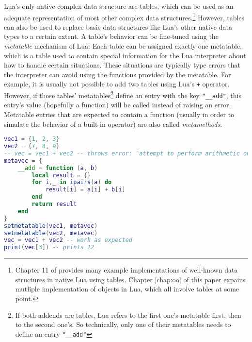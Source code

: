 Lua's only native complex data structure are tables, which can be used as an adequate representation of most other complex data structures.\footnote{Chapter 11 of \cite{Ierusalimschy2006} provides many example implementations of well-known data structures in native Lua using tables. Chapter \ref{chap:oo} of this paper expains mutliple implementation of objects in Lua, which all involve tables at some point.} However, tables can also be used to replace basic data structures like Lua's other native data types to a certain extent. A table's behavior can be fine-tuned using the \emph{metatable} mechanism of Lua: Each table can be assigned exactly one metatable, which is a table used to contain special information for the Lua interpreter about how to handle certain situations. These situations are typically type errors that the interpreter can avoid using the functions provided by the metatable. For example, it is usually not possible to add two tables using Lua's \texttt{+} operator. However, if those tables' metatables\footnote{If both addends are tables, Lua refers to the first one's metatable first, then to the second one's. So technically, only one of their metatables needs to define an entry \texttt{"\_\_add"}} define an entry with the key \texttt{"\_\_add"}, this entry's value (hopefully a function) will be called instead of raising an error. Metatable entries that are expected to contain a function (usually in order to simulate the behavior of a built-in operator) are also called \emph{metamethods}.

\begin{lstlisting}[language=lua, caption={Defining vector addition using the metamethod \texttt{"\_\_add"}}, label=lst:vecadd, name=lst:vecadd]
vec1 = {1, 2, 3}
vec2 = {7, 8, 9}
-- vec = vec1 + vec2 -- throws error: "attempt to perform arithmetic on global 'vec1' (a table value)"
metavec = {
	__add = function (a, b)
		local result = {}
		for i,_ in ipairs(a) do
			result[i] = a[i] + b[i]
		end
		return result
	end
}
setmetatable(vec1, metavec)
setmetatable(vec2, metavec)
vec = vec1 + vec2 -- work as expected
print(vec[3]) -- prints 12
\end{lstlisting}

